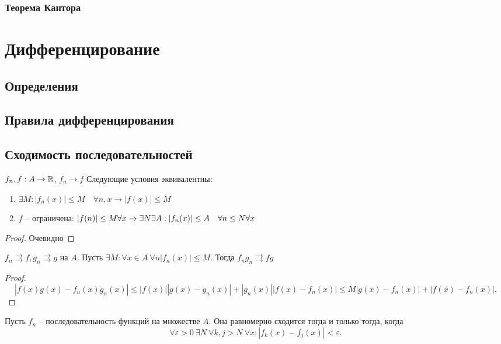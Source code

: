 \documentclass[12pt]{report}
\begin{document}
\subsection{Теорема Кантора}
\chapter{Дифференцирование}
\section{Определения}
\section{Правила дифференцирования}
\section{Сходимость последовательностей}
\begin{thm}
    $f_n, f : A \to  \mathbb{R}$, $f_n \to  f$
    Следующие условия эквивалентны:
     \begin{enumerate}
	 \item $\exists M : |f_n(x)| \le  M \quad \forall  n, x \longrightarrow |f(x)| \le  M$
	 \item $f$ -- ограничена: $|f(n)| \le  M \forall  x \to \exists  N \exists  A: \\
	     |f_n(x)| \le A \quad \forall  n \le  N \forall  x$
    \end{enumerate}
\end{thm}
\begin{proof}
    Очевидно
\end{proof}
\begin{thm}
    $f_n \rightrightarrows  f, g_n \rightrightarrows  g$ на $A$.
    Пусть $\exists M: \forall x \in A ~\forall  n |f_n(x) | \le  M$. Тогда  $f_n g_n \rightrightarrows fg$
\end{thm}
\begin{proof}
    \[
	|f(x) g(x) - f_n(x) g_n(x)| \le  |f(x) ||g(x) - g_n(x) | + | g_n(x)| |f(x) - f_n(x)| \le  M | g(x) - f_n(x)  |+ | f(x) - f_n(x)|
    .\]  
\end{proof}
\begin{thm}
    Пусть $f_n$ -- последовательность функций на множестве $A$. Она равномерно сходится  тогда и только тогда, когда  
    \[
	\forall  \varepsilon >0~ \exists  N ~ \forall  k, j> N~ \forall x : |f_k(x) - f_j(x)| < \varepsilon 
    .\] \label{usl}
\end{thm}
\end{document}
